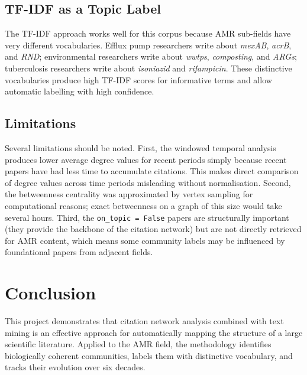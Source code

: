 \documentclass[12pt,a4paper]{article}
\begin{document}
\subsection{TF-IDF as a Topic Label}

The TF-IDF approach works well for this corpus because AMR sub-fields have very
different vocabularies.
Efflux pump researchers write about \textit{mexAB}, \textit{acrB}, and \textit{RND};
environmental researchers write about \textit{wwtps}, \textit{composting}, and
\textit{ARGs}; tuberculosis researchers write about \textit{isoniazid} and
\textit{rifampicin}.
These distinctive vocabularies produce high TF-IDF scores for informative terms and
allow automatic labelling with high confidence.

\subsection{Limitations}

Several limitations should be noted.
First, the windowed temporal analysis produces lower average degree values for recent
periods simply because recent papers have had less time to accumulate citations.
This makes direct comparison of degree values across time periods misleading without
normalisation.
Second, the betweenness centrality was approximated by vertex sampling for computational
reasons; exact betweenness on a graph of this size would take several hours.
Third, the \texttt{on\_topic = False} papers are structurally important (they provide
the backbone of the citation network) but are not directly retrieved for AMR content,
which means some community labels may be influenced by foundational papers from adjacent
fields.

\section{Conclusion}

This project demonstrates that citation network analysis combined with text mining is
an effective approach for automatically mapping the structure of a large scientific
literature.
Applied to the AMR field, the methodology identifies biologically coherent communities,
labels them with distinctive vocabulary, and tracks their evolution over six decades.
\end{document}
